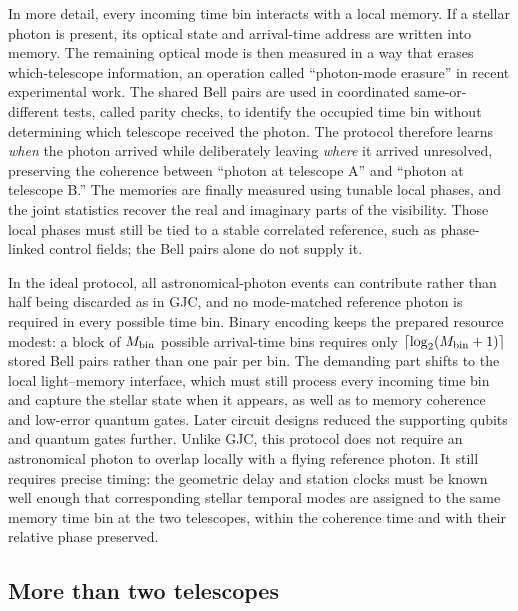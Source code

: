 \documentclass[]{spie}
\begin{document}
In more detail, every incoming time bin interacts with a local memory. If a stellar photon is present, its optical state and arrival-time address are written into memory. The remaining optical mode is then measured in a way that erases which-telescope information, an operation called ``photon-mode erasure'' in recent experimental work. The shared Bell pairs are used in coordinated same-or-different tests, called parity checks, to identify the occupied time bin without determining which telescope received the photon. The protocol therefore learns \emph{when} the photon arrived while deliberately leaving \emph{where} it arrived unresolved, preserving the coherence between ``photon at telescope A'' and ``photon at telescope B.'' The memories are finally measured using tunable local phases, and the joint statistics recover the real and imaginary parts of the visibility. Those local phases must still be tied to a stable correlated reference, such as phase-linked control fields; the Bell pairs alone do not supply it.\cite{Khabiboulline2019PRL,ZhangJennewein2025,Stas2026}

In the ideal protocol, all astronomical-photon events can contribute rather than half being discarded as in GJC, and no mode-matched reference photon is required in every possible time bin. Binary encoding keeps the prepared resource modest: a block of $M_{\rm bin}$ possible arrival-time bins requires only $\lceil\log_2(M_{\rm bin}+1)\rceil$ stored Bell pairs rather than one pair per bin. The demanding part shifts to the local light--memory interface, which must still process every incoming time bin and capture the stellar state when it appears, as well as to memory coherence and low-error quantum gates. Later circuit designs reduced the supporting qubits and quantum gates further.\cite{Khabiboulline2019PRL,Khabiboulline2019PRA,Czupryniak2023} Unlike GJC, this protocol does not require an astronomical photon to overlap locally with a flying reference photon. It still requires precise timing: the geometric delay and station clocks must be known well enough that corresponding stellar temporal modes are assigned to the same memory time bin at the two telescopes, within the coherence time and with their relative phase preserved.

\subsection{More than two telescopes}
\end{document}
